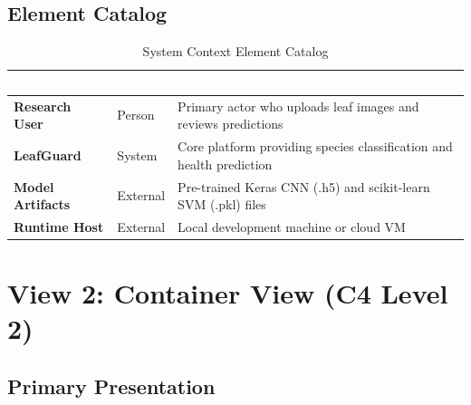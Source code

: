 \documentclass[11pt,a4paper,oneside]{report}
\begin{document}
\subsection{Element Catalog}

\begin{table}[H]
\centering\footnotesize
\caption{System Context Element Catalog}
\label{tab:context-catalog}
\begin{tabularx}{\textwidth}{>{\bfseries}l l X}
\toprule
\rowcolor{tableheader}
\textcolor{white}{Element} & \textcolor{white}{Type} & \textcolor{white}{Description} \\
\midrule
Research User     & Person    & Primary actor who uploads leaf images and reviews predictions \\
LeafGuard         & System    & Core platform providing species classification and health prediction \\
Model Artifacts   & External  & Pre-trained Keras CNN (.h5) and scikit-learn SVM (.pkl) files \\
Runtime Host      & External  & Local development machine or cloud VM \\
\bottomrule
\end{tabularx}
\end{table}


\newpage
\section{View 2: Container View (C4 Level 2)}

\subsection{Primary Presentation}
\end{document}
